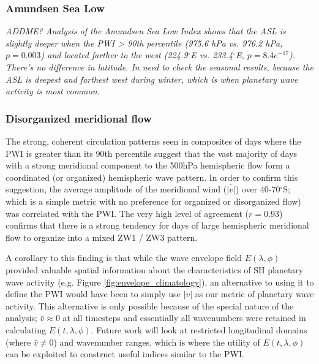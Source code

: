 \subsubsection{Amundsen Sea Low}

\textit{ADDME? Analysis of the Amundsen Sea Low Index \citep{Turner2013} shows that the ASL is slightly deeper when the PWI > 90th percentile (975.6 hPa vs. 976.2 hPa, $p = 0.003$) and located farther to the west (224.9$^{\circ}$E vs. 233.4$^{\circ}$E, $p = 8.4e^{-17}$). There's no difference in latitude.  In need to check the seasonal results, because the ASL is deepest and farthest west during winter, which is when planetary wave activity is most common.}  

\subsubsection{Disorganized meridional flow}

The strong, coherent circulation patterns seen in composites of days where the PWI is greater than its 90th percentile suggest that the vast majority of days with a strong meridional component to the 500hPa hemispheric flow form a coordinated (or organized) hemispheric wave pattern. In order to confirm this suggestion, the average amplitude of the meridional wind ($\bar{\lvert v \rvert}$) over 40-70$^{\circ}$S; which is a simple metric with no preference for organized or disorganized flow) was correlated with the PWI. The very high level of agreement ($r = 0.93$) confirms that there is a strong tendency for days of large hemispheric meridional flow to organize into a mixed ZW1 / ZW3 pattern. 

A corollary to this finding is that while the wave envelope field $E(\lambda,\phi)$ provided valuable spatial information about the characteristics of SH planetary wave activity (e.g. Figure \ref{fig:envelope_climatology}), an alternative to using it to define the PWI would have been to simply use $\bar{\lvert v \rvert}$ as our metric of planetary wave activity. This alternative is only possible because of the special nature of the analysis; $\bar{v} \approx 0$ at all timesteps and essentially all wavenumbers were retained in calculating $E(t,\lambda,\phi)$. Future work will look at restricted longitudinal domains (where $\bar{v} \neq 0$) and wavenumber ranges, which is where the utility of $E(t,\lambda,\phi)$ can be exploited to construct useful indices similar to the PWI. 
